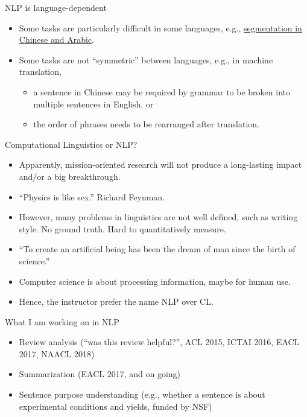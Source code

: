 \documentclass[11pt,handout]{beamer}
\begin{document}
\begin{frame}{NLP is language-dependent}
 \begin{itemize}[<+->]
  \item Some tasks are particularly difficult in some languages, e.g., \href{https://nlp.stanford.edu/software/segmenter.shtml}{segmentation in Chinese and Arabic}. 
  \item Some tasks are not ``symmetric'' between languages, e.g., in machine translation, 
  \begin{itemize}
   \item a sentence in Chinese may be required by grammar to be broken into multiple sentences in English, or 
   \item the order of phrases needs to be rearranged after translation. 
  \end{itemize}
 \end{itemize}
\end{frame}

\begin{frame}{Computational Linguistics or NLP? }
\begin{itemize}
\item Apparently, mission-oriented research will not produce a long-lasting impact and/or a big breakthrough. 
\item ``Physics is like sex.'' Richard Feynman. 
\item  However, many problems in linguistics are not well defined, such as writing style. No ground truth. Hard to quantitatively measure. 
\item ``To create an artificial being has been the dream of man since the birth of science.'' 
\item Computer science is about processing information, maybe for human use. 
\item Hence, the instructor prefer the name NLP over CL. 
\end{itemize}

\end{frame}

\begin{frame}{What I am working on in NLP}
\begin{itemize}[<+->]
\item Review analysis  (``was this review helpful?'', ACL 2015, ICTAI 2016, EACL 2017, NAACL 2018)
\item Summarization (EACL 2017, and on going)
\item Sentence purpose understanding (e.g., whether a sentence is about experimental conditions and yields, funded by NSF) 
\end{itemize}
\end{frame}
\end{document}
